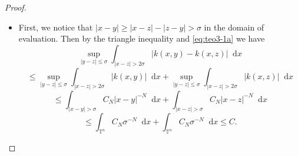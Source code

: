 \documentclass[12pt, reqno]{amsart}
\theoremstyle{definition}
\theoremstyle{remark}
\numberwithin{equation}{section}
\newcommand*\diff{\mathop{}\!\mathrm{d}}
\begin{document}
\begin{proof}
    \begin{itemize}
        \item[(a)] First, we notice that $|x-y| \geq |x - z| - |z - y| > \sigma$ in the domain of evaluation. Then by the triangle inequality and \cref{eq:teo3-1a} we have
        \begin{equation*}
            \sup_{|y-z| \leq \sigma} \int_{|x-z| > 2\sigma}|k(x, y) - k(x, z)|\diff x  
        \end{equation*}
        \begin{equation*}
            \leq \sup_{|y-z| \leq \sigma} \int_{|x-z| > 2\sigma}|k(x, y)|\diff x + \sup_{|y-z| \leq \sigma} \int_{|x-z| > 2\sigma}|k(x, z)|\diff x
        \end{equation*}
        \begin{equation*}
            \leq  \int_{|x-y|>\sigma} C_N|x-y|^{-N} \diff x + \int_{|x-z|>\sigma} C_N|x-z|^{-N} \diff x
        \end{equation*}
        \begin{equation*}
            \leq  \int_{\mathbb{T}^n} C_N\sigma^{-N} \diff x + \int_{\mathbb{T}^n} C_N\sigma^{-N} \diff x \leq C.
        \end{equation*}


\end{itemize}
\end{proof}
\end{document}
